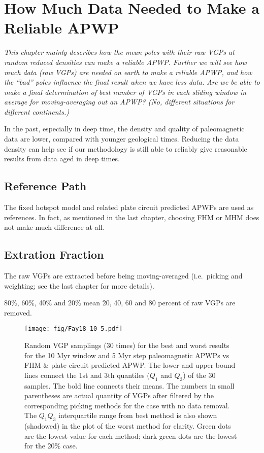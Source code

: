 \chapter{How Much Data Needed to Make a Reliable APWP}\label{chap:DatNeed}
\textit{This chapter mainly describes how the mean poles with their raw VGPs
at random reduced densities can make a reliable APWP\@. Further we will see how
much data (raw VGPs) are needed on earth to make a reliable APWP, and how the
``bad'' poles influence the final result when we have less data. Are we be able
to make a final determination of best number of VGPs in each sliding window in
average for moving-averaging out an APWP? (No, different situations for
different continents.)}
\vfill
\minitoc\newpage

In the past, especially in deep time, the density and quality of paleomagnetic
data are lower, compared with younger geological times. Reducing the data
density can help see if our methodology is still able to reliably give
reasonable results from data aged in deep times.

\section{Reference Path}

The fixed hotspot model and related plate circuit predicted APWPs are used as
references. In fact, as mentioned in the last chapter, choosing FHM or MHM does
not make much difference at all.

\section{Extration Fraction}

The raw VGPs are extracted before being moving-averaged (i.e.\ picking and
weighting; see the last chapter for more details).

80\%, 60\%, 40\% and 20\% mean 20, 40, 60 and 80 percent of raw VGPs are
removed.

\begin{figure}
    \centering
        \texttt{[image: fig/Fay18\_10\_5.pdf]}
    \captionsetup{width=.95\textwidth}
    \caption{Random VGP samplings (30 times) for the best and worst results for
	the 10 Myr window and 5 Myr step paleomagnetic APWPs vs FHM \& plate circuit
	predicted APWP\@. The lower and upper bound lines connect the 1st and 3th
	quantiles ($Q_1$ and $Q_3$) of the 30 samples. The bold line connects their
	means. The numbers in small parentheses are actual quantity of VGPs after
	filtered by the corresponding picking methods for the case with no data
	removal. The $Q_1$\textendash$Q_3$ interquartile range from best method is
	also shown (shadowed) in the plot of the worst method for clarity. Green
	dots are the lowest value for each method; dark green dots are the lowest
	for the 20\% case.}\label{Fig:Fay18_10_5bw}
\end{figure}

